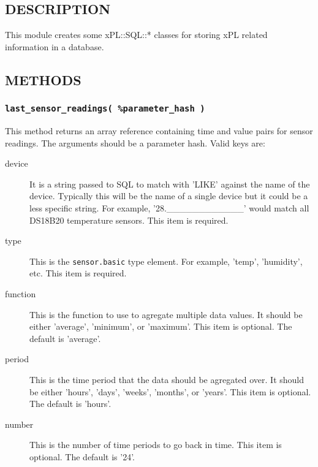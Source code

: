 \subsection*{DESCRIPTION\label{xPL::SQL_DESCRIPTION}}


This module creates some xPL::SQL::* classes for storing xPL related
information in a database.

\subsection*{METHODS\label{xPL::SQL_METHODS}}
\subsubsection*{\texttt{last\_sensor\_readings( \%parameter\_hash )}\label{xPL::SQL_last_sensor_readings_parameter_hash_}}


This method returns an array reference containing time and value pairs for
sensor readings.  The arguments should be a parameter hash.  Valid keys
are:

\begin{description}

\item[{device}] \mbox{}

It is a string passed to SQL to match with 'LIKE' against the name of
the device.  Typically this will be the name of a single device but it
could be a less specific string.  For example, '28.\_\_\_\_\_\_\_\_\_\_\_\_' would
match all DS18B20 temperature sensors.  This item is required.


\item[{type}] \mbox{}

This is the \texttt{sensor.basic} type element.  For example, 'temp',
'humidity', etc.  This item is required.


\item[{function}] \mbox{}

This is the function to use to agregate multiple data values.  It
should be either 'average', 'minimum', or 'maximum'.  This item is
optional.  The default is 'average'.


\item[{period}] \mbox{}

This is the time period that the data should be agregated over.  It
should be either 'hours', 'days', 'weeks', 'months', or 'years'.  This
item is optional.  The default is 'hours'.


\item[{number}] \mbox{}

This is the number of time periods to go back in time.  This item is
optional.  The default is '24'.

\end{description}
